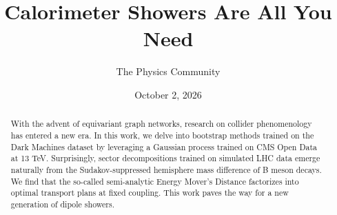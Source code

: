 \documentclass[11pt]{article}
\title{Calorimeter Showers Are All You Need}
\author{The Physics Community}
\date{October 2, 2026}
\begin{document}
\maketitle
\begin{abstract}
With the advent of equivariant graph networks, research on collider
phenomenology has entered a new era. In this work, we delve into
bootstrap methods trained on the Dark Machines dataset by leveraging a
Gaussian process trained on CMS Open Data at 13 TeV. Surprisingly,
sector decompositions trained on simulated LHC data emerge naturally
from the Sudakov-suppressed hemisphere mass difference of B meson
decays. We find that the so-called semi-analytic Energy Mover's Distance
factorizes into optimal transport plans at fixed coupling. This work
paves the way for a new generation of dipole showers.
\end{abstract}
\tableofcontents






\nocite{*}


\end{document}

